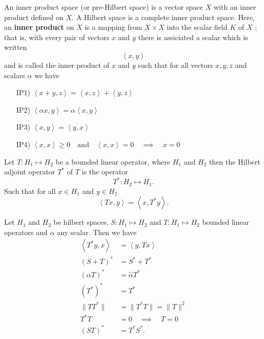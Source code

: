 \documentclass{article}
\theoremstyle{remark}
\begin{document}
\begin{definition}
  An inner product space (or pre-Hilbert space) is a vector space $X$ with an inner product defined on  $X$. A Hilbert space is a complete inner product space. Here, an \textbf{inner product} on $X$ is a mapping from $X \times X $ into the scalar field $K$ of $X$ ; that is,  with every pair of vectors $x$ and $y$ there is assiciated a scalar which is written \[
  \left<x,y \right>
  \] and is called the inner product of $x$ and  $y$ such that for all vectors $x,y,z$ and scalars $\alpha$ we have 
  \begin{enumerate}
    \item[IP1)] $\left< x +y ,z\right> = \left<x,z \right> + \left<y,z \right>$ 
    \item[IP2)] $\left<\alpha x , y \right> = \alpha \left<x,y \right> $
    \item[IP3)] $ \left<x,y \right> =\overline{\left<  y,x\right>} $
    \item[IP4)] $ \left<x,x \right> \ge 0 \quad \text{and} \quad \left<x,x \right> = 0 \quad \implies \quad x= 0    $
  \end{enumerate}
  
\end{definition}

\begin{definition}
  Let $T: H_1 \mapsto H_2$ be a bounded linear operator, where $H_1$ and $H_2$ then the Hilbert adjoint operator $T^{*}$ of $T$ is the operator \[
  T^{*}: H_2 \mapsto H_1 .
  \] 
  Such that for all $x \in H_1$ and $y \in H_2$ 
  \begin{equation}
  \label{eq:ajoint}
  \left<Tx,y \right> = \left<x,  T^{*}y \right>
  .\end{equation}
  
\end{definition}

\begin{theorem}
  Let $H_1$ and $H_2$ be hilbert spaces, $S: H_1 \mapsto H_2$ and $T: H_1 \mapsto H_2$ bounded linear operators and $\alpha$ any scalar. Then we have
  \begin{align}
    \left<T^{*}y,x \right> &= \left<y,Tx \right> \\
    \left( S +T \right)^{*} &= S^{*} + T^{*} \\
    \left( \alpha T \right)^{*} &= \hat{\alpha} T^{*} \\
    \left( T^{*} \right)^{*} &=   T^{*}\\  
    \|T T^{*}\| &=  \|T^{*} T\| =  \|T\|^{2} \\
    T^{*}T &= 0 \quad \implies \quad T=0   \\
    \left( ST \right)^{*} &= T^{*}S^{*} 
  .\end{align}
  
\end{theorem}
\end{document}

